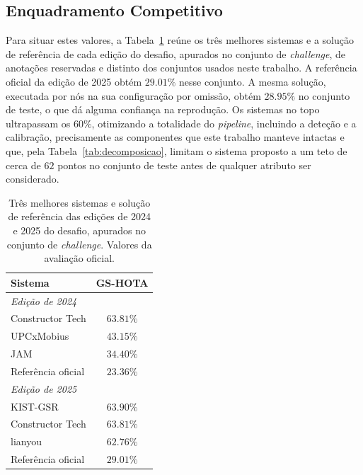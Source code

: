 \subsection{Enquadramento Competitivo}\label{sec:res_leaderboard}

Para situar estes valores, a Tabela~\ref{tab:leaderboard} reúne os três melhores sistemas e a
solução de referência de cada edição do desafio, apurados no conjunto de \emph{challenge}, de
anotações reservadas e distinto dos conjuntos usados neste trabalho. A referência oficial da edição
de 2025 obtém $29.01\%$ nesse conjunto. A mesma solução, executada por nós na sua configuração por
omissão, obtém $28.95\%$ no conjunto de teste, o que dá alguma confiança na reprodução. Os sistemas
no topo ultrapassam os $60\%$, otimizando a totalidade do \emph{pipeline}, incluindo a deteção e a
calibração, precisamente as componentes que este trabalho manteve intactas e que, pela
Tabela~\ref{tab:decomposicao}, limitam o sistema proposto a um teto de cerca de $62$
pontos no conjunto de teste antes de qualquer atributo ser considerado.

\begin{table}[htbp]
    \centering
    \caption{Três melhores sistemas e solução de referência das edições de 2024 e 2025 do desafio,
    apurados no conjunto de \emph{challenge}. Valores da avaliação oficial.}
    \label{tab:leaderboard}
    \begin{tabular}{|l|c|}
        \hline
        \textbf{Sistema} & \textbf{GS-HOTA} \\
        \hline
        \multicolumn{2}{|l|}{\textit{Edição de 2024}} \\
        \hline
        Constructor Tech  & $63.81\%$ \\
        \hline
        UPCxMobius        & $43.15\%$ \\
        \hline
        JAM               & $34.40\%$ \\
        \hline
        Referência oficial & $23.36\%$ \\
        \hline
        \multicolumn{2}{|l|}{\textit{Edição de 2025}} \\
        \hline
        KIST-GSR          & $63.90\%$ \\
        \hline
        Constructor Tech  & $63.81\%$ \\
        \hline
        lianyou           & $62.76\%$ \\
        \hline
        Referência oficial & $29.01\%$ \\
        \hline
    \end{tabular}
\end{table}

